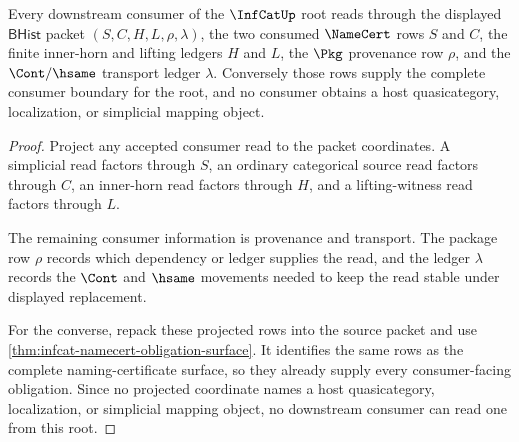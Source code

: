 \begin{theorem}
\label{thm:infcat-consumer-boundary}
Every downstream consumer of the $\InfCatUp$ root reads through the displayed
$\mathsf{BHist}$ packet $(S,C,H,L,\rho,\lambda)$, the two consumed
$\NameCert$ rows $S$ and $C$, the finite inner-horn and lifting ledgers
$H$ and $L$, the $\Pkg$ provenance row $\rho$, and the $\Cont/\hsame$
transport ledger $\lambda$. Conversely those rows supply the complete
consumer boundary for the root, and no consumer obtains a host
quasicategory, localization, or simplicial mapping object.
\end{theorem}
\begin{proof}
Project any accepted consumer read to the packet coordinates. A simplicial
read factors through $S$, an ordinary categorical source read factors through
$C$, an inner-horn read factors through $H$, and a lifting-witness read
factors through $L$.

The remaining consumer information is provenance and transport. The package
row $\rho$ records which dependency or ledger supplies the read, and the
ledger $\lambda$ records the $\Cont$ and $\hsame$ movements needed to keep the
read stable under displayed replacement.

For the converse, repack these projected rows into the source packet and use
\autoref{thm:infcat-namecert-obligation-surface}. It identifies the same rows
as the complete naming-certificate surface, so they already supply every
consumer-facing obligation. Since no projected coordinate names a host
quasicategory, localization, or simplicial mapping object, no downstream
consumer can read one from this root.
\end{proof}

